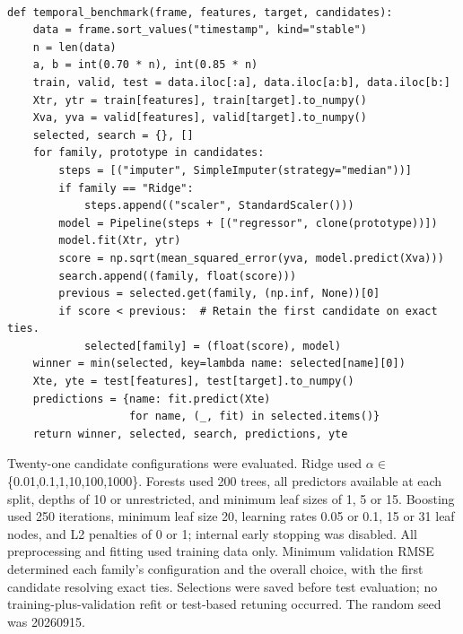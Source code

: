 \documentclass[11pt,a4paper]{article}
\begin{document}
\par\noindent\begin{minipage}{\linewidth}

\begin{lstlisting}[caption={Chronological model-selection and frozen-test evaluation core. The runnable companion supplies the NumPy/scikit-learn imports, original-data cleaning and fixed candidate grid. No training-plus-validation refit is performed.},label={lst:evaluation}]

def temporal_benchmark(frame, features, target, candidates):
    data = frame.sort_values("timestamp", kind="stable")
    n = len(data)
    a, b = int(0.70 * n), int(0.85 * n)
    train, valid, test = data.iloc[:a], data.iloc[a:b], data.iloc[b:]
    Xtr, ytr = train[features], train[target].to_numpy()
    Xva, yva = valid[features], valid[target].to_numpy()
    selected, search = {}, []
    for family, prototype in candidates:
        steps = [("imputer", SimpleImputer(strategy="median"))]
        if family == "Ridge":
            steps.append(("scaler", StandardScaler()))
        model = Pipeline(steps + [("regressor", clone(prototype))])
        model.fit(Xtr, ytr)
        score = np.sqrt(mean_squared_error(yva, model.predict(Xva)))
        search.append((family, float(score)))
        previous = selected.get(family, (np.inf, None))[0]
        if score < previous:  # Retain the first candidate on exact ties.
            selected[family] = (float(score), model)
    winner = min(selected, key=lambda name: selected[name][0])
    Xte, yte = test[features], test[target].to_numpy()
    predictions = {name: fit.predict(Xte)
                   for name, (_, fit) in selected.items()}
    return winner, selected, search, predictions, yte

\end{lstlisting}

\end{minipage}\par

Twenty-one candidate configurations were evaluated. Ridge used \ensuremath{\alpha}\ensuremath{\in}\{0.01,0.1,1,10,100,1000\}. Forests used 200 trees, all predictors available at each split, depths of 10 or unrestricted, and minimum leaf sizes of 1, 5 or 15. Boosting used 250 iterations, minimum leaf size 20, learning rates 0.05 or 0.1, 15 or 31 leaf nodes, and L2 penalties of 0 or 1; internal early stopping was disabled. All preprocessing and fitting used training data only. Minimum validation RMSE determined each family's configuration and the overall choice, with the first candidate resolving exact ties. Selections were saved before test evaluation; no training-plus-validation refit or test-based retuning occurred. The random seed was 20260915.
\end{document}
